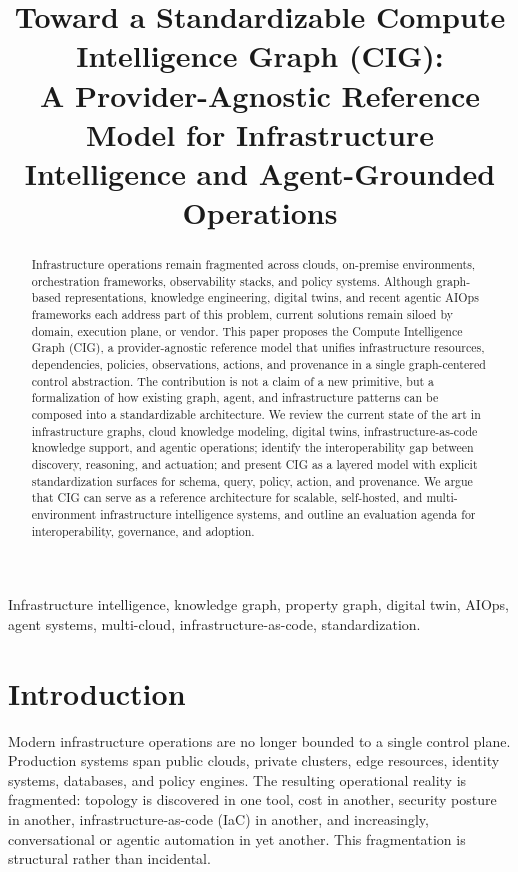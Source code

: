 \documentclass[conference]{IEEEtran}
\title{Toward a Standardizable Compute Intelligence Graph (CIG):\\
A Provider-Agnostic Reference Model for Infrastructure Intelligence and Agent-Grounded Operations}
\author{\IEEEauthorblockN{Anonymous Submission}}
\begin{document}
\maketitle

\begin{abstract}
Infrastructure operations remain fragmented across clouds, on-premise environments, orchestration frameworks, observability stacks, and policy systems. Although graph-based representations, knowledge engineering, digital twins, and recent agentic AIOps frameworks each address part of this problem, current solutions remain siloed by domain, execution plane, or vendor. This paper proposes the Compute Intelligence Graph (CIG), a provider-agnostic reference model that unifies infrastructure resources, dependencies, policies, observations, actions, and provenance in a single graph-centered control abstraction. The contribution is not a claim of a new primitive, but a formalization of how existing graph, agent, and infrastructure patterns can be composed into a standardizable architecture. We review the current state of the art in infrastructure graphs, cloud knowledge modeling, digital twins, infrastructure-as-code knowledge support, and agentic operations; identify the interoperability gap between discovery, reasoning, and actuation; and present CIG as a layered model with explicit standardization surfaces for schema, query, policy, action, and provenance. We argue that CIG can serve as a reference architecture for scalable, self-hosted, and multi-environment infrastructure intelligence systems, and outline an evaluation agenda for interoperability, governance, and adoption.
\end{abstract}

\begin{IEEEkeywords}
Infrastructure intelligence, knowledge graph, property graph, digital twin, AIOps, agent systems, multi-cloud, infrastructure-as-code, standardization.
\end{IEEEkeywords}

\section{Introduction}
Modern infrastructure operations are no longer bounded to a single control plane. Production systems span public clouds, private clusters, edge resources, identity systems, databases, and policy engines. The resulting operational reality is fragmented: topology is discovered in one tool, cost in another, security posture in another, infrastructure-as-code (IaC) in another, and increasingly, conversational or agentic automation in yet another. This fragmentation is structural rather than incidental.
\end{document}
